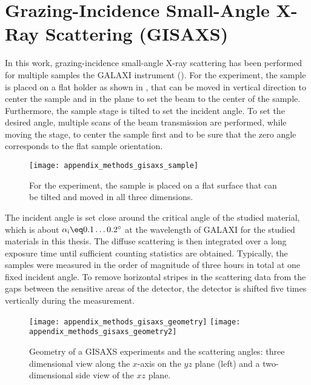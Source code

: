 \documentclass[\main/dresen_thesis.tex]{subfiles}
\begin{document}
  \section{Grazing-Incidence Small-Angle X-Ray Scattering (GISAXS)}
    \label{ch:methods:gisaxs}
    In this work, grazing-incidence small-angle X-ray scattering has been performed for multiple samples the GALAXI instrument ().
    For the experiment, the sample is placed on a flat holder as shown in , that can be moved in vertical direction to center the sample and in the plane to set the beam to the center of the sample.
    Furthermore, the sample stage is tilted to set the incident angle.
    To set the desired angle, multiple scans of the beam transmission are performed, while moving the stage, to center the sample first and to be sure that the zero angle corresponds to the flat sample orientation.
    \begin{figure}[tb]
      \centering
      \texttt{[image: appendix\_methods\_gisaxs\_sample]}
      \caption{\label{fig:methods:gisaxs:samples}For the experiment, the sample is placed on a flat surface that can be tilted and moved in all three dimensions.}
    \end{figure}

    The incident angle is set close around the critical angle of the studied material, which is about $\alpha_\mathrm{i} \eq 0.1 \ldots 0.2 ^\circ$ at the wavelength of GALAXI for the studied materials in this thesis.
    The diffuse scattering is then integrated over a long exposure time until sufficient counting statistics are obtained.
    Typically, the samples were measured in the order of magnitude of three hours in total at one fixed incident angle.
    To remove horizontal stripes in the scattering data from the gaps between the sensitive areas of the detector, the detector is shifted five times vertically during the measurement.

    \begin{figure}[tb]
      \centering
      \texttt{[image: appendix\_methods\_gisaxs\_geometry]}
      \texttt{[image: appendix\_methods\_gisaxs\_geometry2]}
      \caption{\label{fig:methods:gisaxs:geometry}Geometry of a GISAXS experiments and the scattering angles: three dimensional view along the $x$-axis on the $yz$ plane (left) and a two-dimensional side view of the $xz$ plane.}
    \end{figure}
\end{document}
